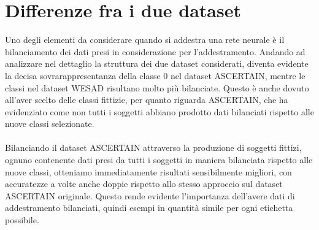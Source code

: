 \section{Differenze fra i due dataset}
Uno degli elementi da considerare quando si addestra una rete neurale è il bilanciamento dei dati presi in considerazione per l'addestramento.
Andando ad analizzare nel dettaglio la struttura dei due dataset considerati, diventa evidente la decisa sovrarappresentanza della classe 0 nel dataset ASCERTAIN, mentre le classi nel dataset WESAD risultano molto più bilanciate. Questo è anche dovuto all'aver scelto delle classi fittizie, per quanto riguarda ASCERTAIN, che ha evidenziato come non tutti i soggetti abbiano prodotto dati bilanciati rispetto alle nuove classi selezionate.\\\\
Bilanciando il dataset ASCERTAIN attraverso la produzione di soggetti fittizi, ognuno contenente dati presi da tutti i soggetti in maniera bilanciata rispetto alle nuove classi, otteniamo immediatamente risultati sensibilmente migliori, con accuratezze a volte anche doppie rispetto allo stesso approccio sul dataset ASCERTAIN originale. Questo rende evidente l'importanza dell'avere dati di addestramento bilanciati, quindi esempi in quantità simile per ogni etichetta possibile.
